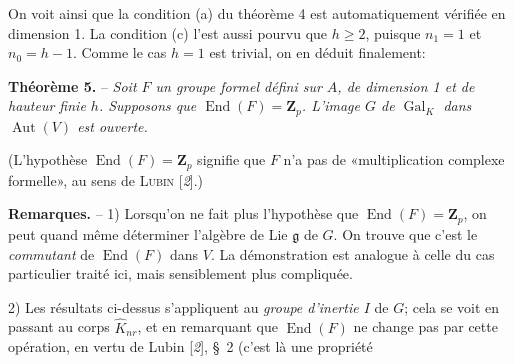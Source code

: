 On voit ainsi que la condition (a) du théorème 4 est automatiquement vérifiée en dimension 1. La condition (c) l’est aussi pourvu que $h\geqslant 2$, puisque $n_1=1$ et $n_0=h-1$. Comme le cas $h=1$ est trivial, on en déduit finalement:

\textbf{Théorème 5.} -- \textit{Soit $F$ un groupe formel défini sur $A$, de dimension 1 et de hauteur finie $h$. Supposons que $\operatorname{End}(F)=\mathbf{Z}_p$. L’image $G$ de $\operatorname{Gal}_K$ dans $\operatorname{Aut}(V)$ est ouverte.}

(L’hypothèse $\operatorname{End}(F)=\mathbf{Z}_p$ signifie que $F$ n’a pas de «multiplication complexe formelle», au sens de \textsc{Lubin} [\textit{2}].)

\textbf{Remarques.} -- 1) Lorsqu’on ne fait plus l’hypothèse que $\operatorname{End}(F)=\mathbf{Z}_p$, on peut quand même déterminer l’algèbre de Lie $\mathfrak{g}$ de $G$. On trouve que c’est le \textit{commutant} de $\operatorname{End}(F)$ dans $V$. La démonstration est analogue à celle du cas particulier traité ici, mais sensiblement plus compliquée.%

2) Les résultats ci-dessus s’appliquent au \textit{groupe d’inertie $I$} de $G$; cela se voit en passant au corps $\hat K_{nr}$, et en remarquant que $\operatorname{End}(F)$ ne change pas par cette opération, en vertu de Lubin [\textit{2}], \S~2 (c’est là une propriété
